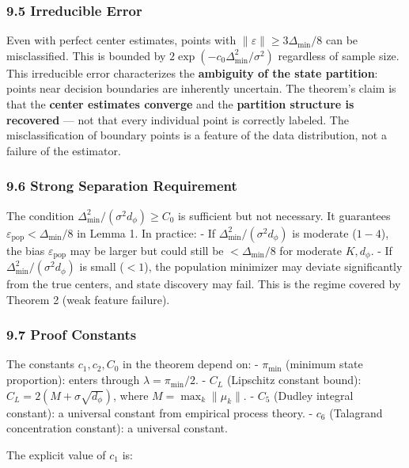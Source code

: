 \documentclass[
  12pt,
]{ctexart}
\begin{document}
\subsubsection{9.5 Irreducible Error}\label{irreducible-error}

Even with perfect center estimates, points with
\(\|\varepsilon\| \geq 3\Delta_{\min}/8\) can be misclassified. This is
bounded by \(2\exp(-c_0 \Delta_{\min}^2 / \sigma^2)\) regardless of
sample size. This irreducible error characterizes the \textbf{ambiguity
of the state partition}: points near decision boundaries are inherently
uncertain. The theorem's claim is that the \textbf{center estimates
converge} and the \textbf{partition structure is recovered} --- not that
every individual point is correctly labeled. The misclassification of
boundary points is a feature of the data distribution, not a failure of
the estimator.

\subsubsection{9.6 Strong Separation
Requirement}\label{strong-separation-requirement}

The condition \(\Delta_{\min}^2 / (\sigma^2 d_\phi) \geq C_0\) is
sufficient but not necessary. It guarantees
\(\varepsilon_{\text{pop}} < \Delta_{\min}/8\) in Lemma 1. In practice:
- If \(\Delta_{\min}^2 / (\sigma^2 d_\phi)\) is moderate (\(1-4\)), the
bias \(\varepsilon_{\text{pop}}\) may be larger but could still be
\(< \Delta_{\min}/8\) for moderate \(K,d_\phi\). - If
\(\Delta_{\min}^2 / (\sigma^2 d_\phi)\) is small (\(< 1\)), the
population minimizer may deviate significantly from the true centers,
and state discovery may fail. This is the regime covered by Theorem 2
(weak feature failure).

\subsubsection{9.7 Proof Constants}\label{proof-constants}

The constants \(c_1, c_2, C_0\) in the theorem depend on: -
\(\pi_{\min}\) (minimum state proportion): enters through
\(\lambda = \pi_{\min}/2\). - \(C_L\) (Lipschitz constant bound):
\(C_L = 2(M + \sigma\sqrt{d_\phi})\), where \(M = \max_k \|\mu_k\|\). -
\(C_5\) (Dudley integral constant): a universal constant from empirical
process theory. - \(c_6\) (Talagrand concentration constant): a
universal constant.

The explicit value of \(c_1\) is:
\end{document}
